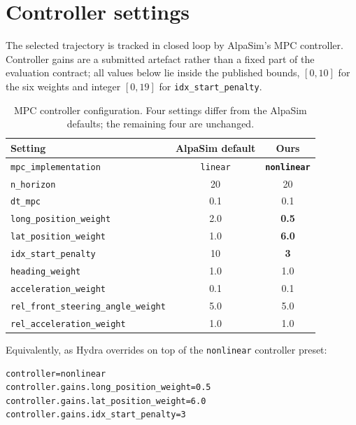 
\section{Controller settings}
\label{app:mpc}

The selected trajectory is tracked in closed loop by AlpaSim's MPC controller.
Controller gains are a submitted artefact rather than a fixed part of the
evaluation contract; all values below lie inside the published bounds, $[0,10]$
for the six weights and integer $[0,19]$ for \texttt{idx\_start\_penalty}.

\begin{table}[h]
\centering
\small
\begin{tabular}{lcc}
\toprule
Setting & AlpaSim default & \textbf{Ours} \\
\midrule
\texttt{mpc\_implementation}              & \texttt{linear} & \textbf{\texttt{nonlinear}} \\
\texttt{n\_horizon}                       & 20   & 20 \\
\texttt{dt\_mpc}                          & 0.1  & 0.1 \\
\midrule
\texttt{long\_position\_weight}           & 2.0  & \textbf{0.5} \\
\texttt{lat\_position\_weight}            & 1.0  & \textbf{6.0} \\
\texttt{idx\_start\_penalty}              & 10   & \textbf{3} \\
\texttt{heading\_weight}                  & 1.0  & 1.0 \\
\texttt{acceleration\_weight}             & 0.1  & 0.1 \\
\texttt{rel\_front\_steering\_angle\_weight} & 5.0 & 5.0 \\
\texttt{rel\_acceleration\_weight}        & 1.0  & 1.0 \\
\bottomrule
\end{tabular}
\caption{MPC controller configuration. Four settings differ from the AlpaSim
defaults; the remaining four are unchanged.}
\label{tab:mpc}
\end{table}

Equivalently, as Hydra overrides on top of the \texttt{nonlinear} controller
preset:

\begin{verbatim}
controller=nonlinear
controller.gains.long_position_weight=0.5
controller.gains.lat_position_weight=6.0
controller.gains.idx_start_penalty=3
\end{verbatim}
